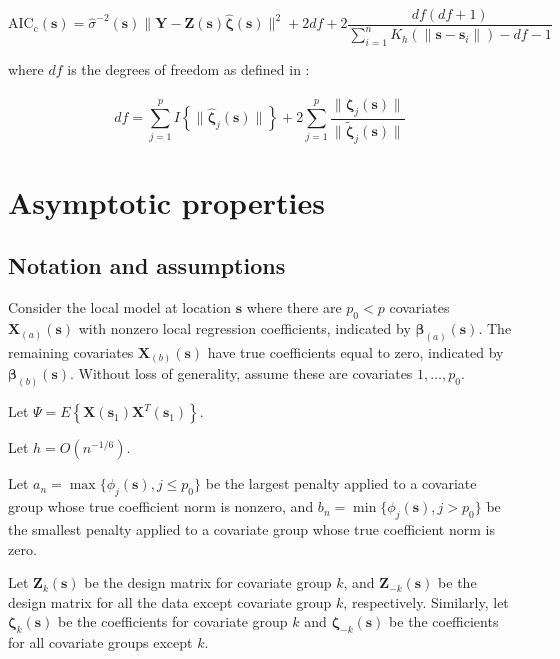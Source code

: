 \documentclass[authoryear, review, 11pt]{elsarticle}
\begin{document}
        \begin{equation}
            \text{AIC}_{\text{c}}(\bm{s}) = \hat{\sigma}^{-2}(\bm{s}) \|\bm{Y} - \bm{Z}(\bm{s}) \hat{\bm{\zeta}}(\bm{s}) \|^2 + 2df + 2\frac{df (df+1)}{\sum_{i=1}^n K_h(\| \bm{s} - \bm{s}_i \|)-df-1}
        \end{equation}

        where $df$ is the degrees of freedom as defined in \cite{Yuan-Lin-2006}:

        \begin{equation}
            df = \sum_{j=1}^p I \left\{ \| \hat{\bm{\zeta}}_j(\bm{s}) \| \right\} + 2 \sum_{j=1}^p \frac{\| \hat{\bm{\zeta}}_j(\bm{s}) \|}{\| \tilde{\bm{\zeta}}_j(\bm{s}) \|}
        \end{equation}

    \section{Asymptotic properties}

        \subsection{Notation and assumptions}
        Consider the local model at location $\bm{s}$ where there are $p_0 < p$ covariates $\bm{X}_{(a)}(\bm{s})$ with nonzero local regression coefficients, indicated by $\bm{\beta}_{(a)}(\bm{s})$. The remaining covariates $\bm{X}_{(b)}(\bm{s})$ have true coefficients equal to zero, indicated by $\bm{\beta}_{(b)}(\bm{s})$. Without loss of generality, assume these are covariates $1, \dots, p_0$.

        Let $\Psi = E \left\{ \bm{X}(\bm{s}_1) \bm{X}^T(\bm{s}_1) \right\}$.

        Let $h = O(n^{-1/6})$.
        
        Let $a_n = \max \{ \phi_j(\bm{s}), j \le p_0 \}$ be the largest penalty applied to a covariate group whose true coefficient norm is nonzero, and $b_n = \min \{ \phi_j(\bm{s}), j > p_0 \}$ be the smallest penalty applied to a covariate group whose true coefficient norm is zero.
        
        Let $\bm{Z}_k(\bm{s})$ be the design matrix for covariate group $k$, and $\bm{Z}_{-k}(\bm{s})$ be the design matrix for all the data except covariate group $k$, respectively. Similarly, let $\bm{\zeta}_k(\bm{s})$ be the coefficients for covariate group $k$ and $\bm{\zeta}_{-k}(\bm{s})$ be the coefficients for all covariate groups except $k$.
\end{document}
